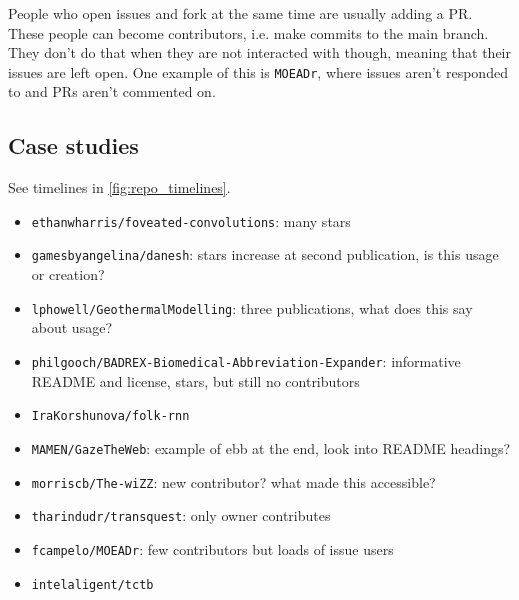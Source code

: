 \documentclass[10pt,a4paper]{scrartcl}
\begin{document}
People who open issues and fork at the same time are usually adding a PR.
These people can become contributors, i.e. make commits to the main branch.
They don't do that when they are not interacted with though, meaning that their issues are left open.
One example of this is \verb|MOEADr|, where issues aren't responded to and PRs aren't commented on.

\subsection*{Case studies}

See timelines in \ref{fig:repo_timelines}.

\begin{itemize}
    \item \verb|ethanwharris/foveated-convolutions|: many stars
    \item \verb|gamesbyangelina/danesh|: stars increase at second publication, is this usage or creation?
    \item \verb|lphowell/GeothermalModelling|: three publications, what does this say about usage?
    \item \verb|philgooch/BADREX-Biomedical-Abbreviation-Expander|: informative README and license, stars, but still no contributors
    \item \verb|IraKorshunova/folk-rnn|
    \item \verb|MAMEN/GazeTheWeb|: example of ebb at the end, look into README headings?
    \item \verb|morriscb/The-wiZZ|: new contributor? what made this accessible?
    \item \verb|tharindudr/transquest|: only owner contributes
    \item \verb|fcampelo/MOEADr|: few contributors but loads of issue users
    \item \verb|intelaligent/tctb|
\end{itemize}
\end{document}

